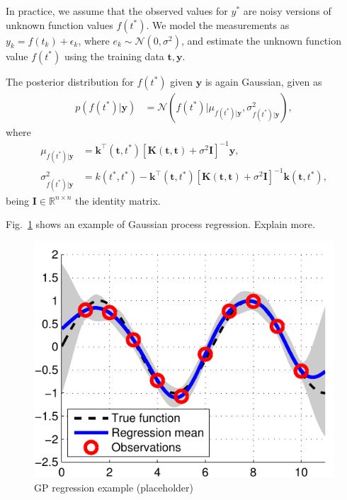 \documentclass[journal]{IEEEtran}
\newcommand{\simo}[1]{{\color{red}#1}}
\begin{document}
In practice, we assume that the observed values for $y^*$ are noisy versions of unknown function values $f(t^*)$.
We model the measurements as $y_k = f(t_k) + \epsilon_k$, where $e_k\sim \mathcal{N}(0, \sigma^2)$, and estimate
the unknown function value $f(t^*)$ using the training data $\mathbf{t}, \mathbf{y}$.

The posterior distribution for $f(t^*)$ given $\mathbf{y}$ is again Gaussian, given as
\begin{align*}
p(f(t^*)|\mathbf{y}) & =\mathcal{N}(f(t^*)|\mu_{f(t^*)|\mathbf{y}}, \sigma^2_{f(t^*)|\mathbf{y}}),
\end{align*}
where
\begin{align*}
\mu_{f(t^*)|\mathbf{y}} & = \mathbf{k}^{\top}(\mathbf{t}, t^*)\left[\mathbf{K}(\mathbf{t}, \mathbf{t}) +
\sigma^2\mathbf{I}\right]^{-1}\mathbf{y},\\
\sigma^2_{f(t^*)|\mathbf{y}} & = k(t^*, t^*) - \mathbf{k}^{\top}(\mathbf{t}, t^*)\left[\mathbf{K}(\mathbf{t}, \mathbf{t}) +
\sigma^2\mathbf{I}\right]^{-1}\mathbf{k}(\mathbf{t}, t^*),
\end{align*}
being $\mathbf{I}\in\mathbb{R}^{n\times n}$ the identity matrix.

Fig.~\ref{reg_ex} shows an example of Gaussian process regression. \simo{Explain more.}

\begin{figure}[!t]
\centering
\includegraphics[width=\columnwidth]{reg_ex}
\caption{GP regression example (placeholder)}
\label{reg_ex}
\end{figure}
\end{document}
